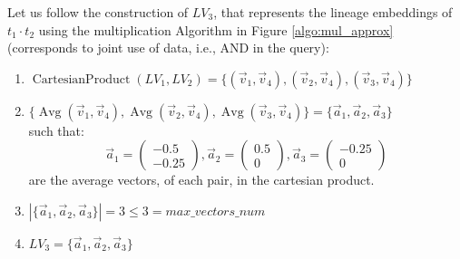 \begin{example-withrun}
    Let us follow the construction of $LV_3$, that represents the lineage embeddings of $t_1 \cdot t_2$ using the multiplication Algorithm in Figure \ref{algo:mul_approx} (corresponds to joint use of data, i.e., AND in the query):
    \begin{enumerate}
        \item $\operatorname{CartesianProduct}(LV_1, LV_2) = \{(\vec v_1, \vec v_4), (\vec v_2, \vec v_4), (\vec v_3, \vec v_4)\}$
        \item $\{\operatorname{Avg}(\vec v_1, \vec v_4), \operatorname{Avg}(\vec v_2, \vec v_4), \operatorname{Avg}(\vec v_3, \vec v_4)\} = \{\vec a_1, \vec a_2, \vec a_3\}$\\
        such that:
        \begin{equation*}
            \vec a_1 = \begin{pmatrix} -0.5\\ -0.25 \end{pmatrix},
            \vec a_2 = \begin{pmatrix} 0.5\\ 0 \end{pmatrix},
            \vec a_3 = \begin{pmatrix} -0.25\\ 0 \end{pmatrix}
        \end{equation*}
        are the average vectors, of each pair, in the cartesian product.
        \item $|\{\vec a_1, \vec a_2, \vec a_3\}| = 3 \leq 3 = max\_vectors\_num$
        \item $LV_3 = \{\vec a_1, \vec a_2, \vec a_3\}$
    \end{enumerate}
\end{example-withrun}




% 




